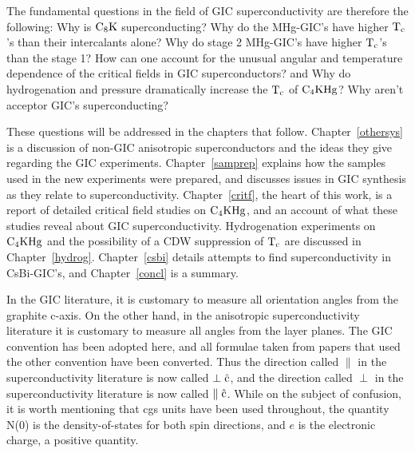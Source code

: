        The fundamental questions in the field of GIC superconductivity are
therefore  the following: Why  is $\rm C_8K$  superconducting?   Why do the
MHg-GIC's  have higher $\rm T_c$'s than  their intercalants  alone?  Why do
stage 2 MHg-GIC's have higher $\rm T_c$'s than  the  stage 1?  How  can one
account for the unusual angular and  temperature dependence of the critical
fields in GIC   superconductors?   and Why do  hydrogenation  and  pressure
dramatically increase  the $\rm T_c$ of $\rm  C_4KHg$?  Why aren't acceptor
GIC's superconducting?

        These questions  will be addressed   in  the chapters that  follow.
Chapter~\ref{othersys}     is  a     discussion    of non-GIC   anisotropic
superconductors  and the   ideas they  give regarding the  GIC experiments.
Chapter~\ref{samprep} explains how the samples used in the  new experiments
were  prepared, and discusses issues  in  GIC synthesis as  they  relate to
superconductivity.  Chapter~\ref{critf}, the  heart  of   this  work,  is a
report of detailed critical field studies  on $\rm C_4KHg$,  and an account
of what these  studies reveal about GIC  superconductivity.   Hydrogenation
experiments  on $\rm C_4KHg$ and the  possibility  of a CDW  suppression of
$\rm T_c$   are discussed  in    Chapter~\ref{hydrog}.   Chapter~\ref{csbi}
details     attempts    to find superconductivity    in    CsBi-GIC's,  and
Chapter~\ref{concl} is a summary.

\bigskip
{}  In the GIC literature, it is
customary to measure all orientation angles  from the  graphite c-axis.  On
the  other  hand,  in the   anisotropic superconductivity literature it  is
customary to measure all angles from the layer  planes.  The GIC convention
has been adopted here,  and all formulae  taken from  papers  that used the
other   convention   have  been  converted.   Thus    the  direction called
$\parallel$ in the superconductivity literature is now called $\rm \perp
\hat{c}$, and the direction called $\perp$ in the superconductivity
literature is now called $\rm \parallel \hat{c}$.  While on  the subject of
confusion, it is worth mentioning that cgs units have been used throughout,
the  quantity N(0) is  the density-of-states for  both spin directions, and
$e$ is the electronic charge, a positive quantity.

        
